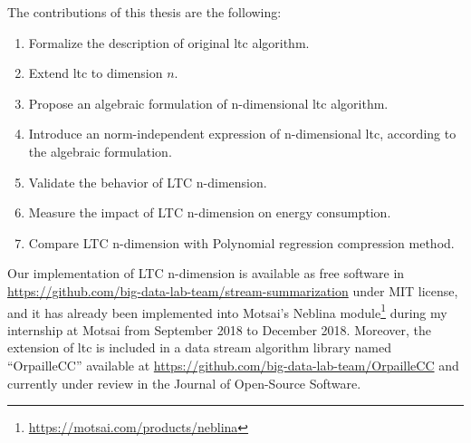
The contributions of this thesis are the following:
\begin{enumerate}
  \item Formalize the description of original \acrshort{ltc} algorithm. 
  \item Extend \acrshort{ltc} to dimension $n$.
  \item Propose an algebraic formulation of n-dimensional \acrshort{ltc}
  algorithm. 
  \item Introduce an norm-independent expression of n-dimensional
  \acrshort{ltc}, according to the algebraic formulation. 
  \item Validate the behavior of LTC n-dimension.
  \item Measure the impact of LTC n-dimension on energy consumption.
  \item Compare LTC n-dimension with Polynomial regression compression method.
\end{enumerate}

Our implementation of LTC n-dimension is available as free software in
\url{https://github.com/big-data-lab-team/stream-summarization} under MIT
license, and it has already been implemented into Motsai's Neblina module\footnote{\url{https://motsai.com/products/neblina}} during my internship at
Motsai from September 2018 to December 2018.  Moreover, the extension of
\acrshort{ltc} is included in a data stream algorithm library named
``OrpailleCC'' available at
\url{https://github.com/big-data-lab-team/OrpailleCC} and currently under review 
in the Journal of Open-Source Software.


